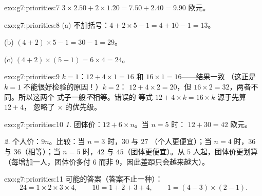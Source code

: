 \begin{solution}{exo:g7:priorities:7}
$3 \times 2.50 + 2 \times 1.20 = 7.50 + 2.40 = 9.90$ 欧元。
\end{solution}

\begin{solution}{exo:g7:priorities:8}
(a) 不加括号：$4 + 2 \times 5 - 1 = 4 + 10 - 1 = 13$。

(b) $(4 + 2) \times 5 - 1 = 30 - 1 = 29$。

(c) $(4 + 2) \times (5 - 1) = 6 \times 4 = 24$。
\end{solution}

\begin{solution}{exo:g7:priorities:9}
$k = 1$：$12 + 4 \times 1 = 16$ 和 $16 \times 1 = 16$——结果一致
（这正是 $k = 1$ 不能很好检验的原因！）$k = 2$：
$12 + 4 \times 2 = 20$，但 $16 \times 2 = 32$，两者不同。所以这两个
式子一般\emph{不}相等。错误的
等式 $12 + 4 \times k = 16 \times k$ 源于先算 $12 + 4$，
忽略了 $\times$ 的优先级。
\end{solution}

\begin{solution}{exo:g7:priorities:10}
\emph{1.} 团体价：$12 + 6 \times n$。当 $n = 5$ 时：
$12 + 30 = 42$ 欧元。

\emph{2.} 个人价：$9n$。比较：当 $n = 3$ 时，$30$ 与 $27$
（个人更便宜）；当 $n = 4$ 时，$36$ 与 $36$（相等）；当 $n = 5$ 时，$42$ 与
$45$（团体更便宜）。从 $5$ 人起，团体价更划算
（每增加一人，团体价多付 $6$ 而非 $9$，因此差距只会越来越大）。
\end{solution}

\begin{solution}{exo:g7:priorities:11}
可能的答案（答案不止一种）：
\[
24 = 1 \times 2 \times 3 \times 4, \qquad
10 = 1 + 2 + 3 + 4, \qquad
1 = (4 - 3) \times (2 - 1).
\]
\end{solution}

